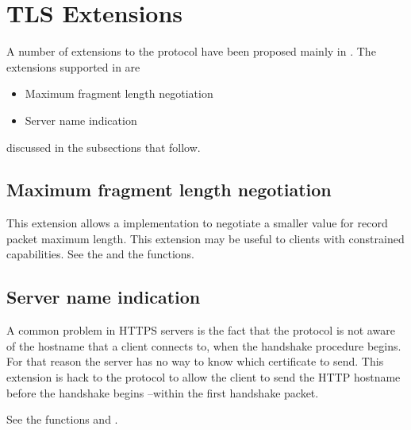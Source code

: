 \section{TLS Extensions}

A number of extensions to the \tls{} protocol have been proposed 
mainly in \cite{TLSEXT}. The extensions supported in \gnutls{} are
\begin{itemize}
\item Maximum fragment length negotiation
\item Server name indication
\end{itemize}
discussed in the subsections that follow.

\subsection*{Maximum fragment length negotiation}

This extension allows a \tlsI{} implementation to negotiate
a smaller value for record packet maximum length. This extension
may be useful to clients with constrained capabilities. See
the 
and the 
functions.

\subsection*{Server name indication}

A common problem in HTTPS servers is the fact that the \tls{}
protocol is not aware of the hostname that a client connects to, when
the handshake procedure begins. For that reason the \tls{} server
has no way to know which certificate to send. This extension is hack
to the \tls{} protocol to allow the client to send the HTTP hostname
before the handshake begins --within the first handshake packet.

See the functions
 and
.

